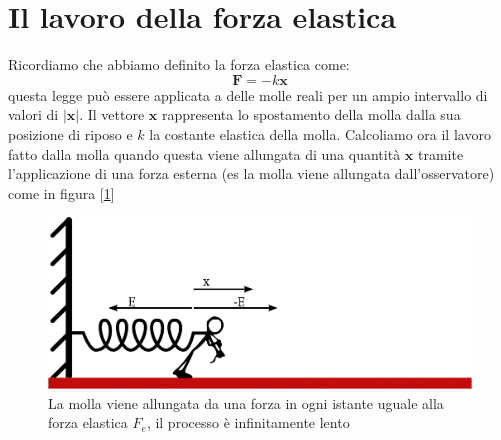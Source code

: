 \documentclass[a4paper,10pt,oneside]{article}
\begin{document}
\section*{Il lavoro della forza elastica}


Ricordiamo che abbiamo definito la forza elastica come:
\begin{equation}
 \mathbf{F}=-k\mathbf{x}
\end{equation}
questa legge può essere applicata a delle molle reali per un  ampio intervallo di valori di $|\mathbf{x}|$.
Il vettore $\mathbf{x}$ rappresenta lo spostamento della molla dalla sua posizione di riposo e $k$ la costante elastica della molla.
Calcoliamo ora il lavoro fatto dalla molla quando questa viene allungata di una quantità $\mathbf{x}$ tramite l'applicazione di una forza esterna (es la molla viene allungata dall'osservatore) come in figura [\ref{fig:molla_allungata}]

\begin{figure}[H]
 \centering
 \includegraphics[width=\textwidth]{./immagini/lavoro_molla1.png}
 \caption{La molla viene allungata da una forza in ogni istante uguale alla forza elastica $F_e$, il processo è infinitamente lento}
 \label{fig:molla_allungata}
\end{figure}
\end{document}
